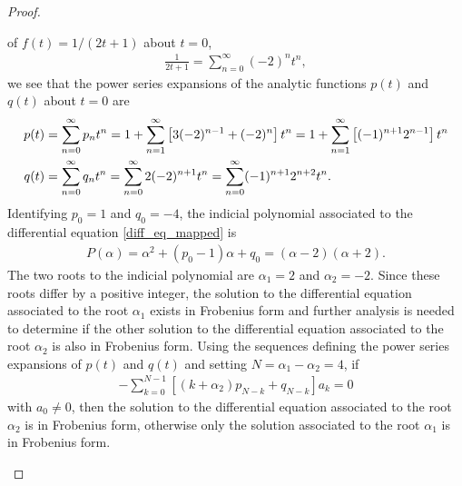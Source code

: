 \documentclass[12pt]{article}
\theoremstyle{definition}
\begin{document}
\begin{proof}
\begin{enumerate}
      of $f(t) = 1/(2t+1)$ about $t=0$,
      \begin{align*}
        \frac{1}{2t+1} = \sum_{n=0}^\infty (-2)^n t^n,
      \end{align*}
      we see that the power series expansions of the analytic functions $p(t)$
      and $q(t)$ about $t=0$ are
      \begin{align}\label{pq_expansion}
        p(t) &= \sum_{n=0}^{\infty}p_n t^n = 1 + \sum_{n=1}^\infty \left[3(-2)^{n-1} + (-2)^{n}\right]t^n  = 1 + \sum_{n=1}^\infty \left[(-1)^{n+1}2^{n-1}\right]t^n \notag \\
        q(t) &= \sum_{n=0}^{\infty}q_n t^n = \sum_{n=0}^\infty2(-2)^{n+1}t^n = \sum_{n=0}^\infty(-1)^{n+1}2^{n+2}t^n.
      \end{align}
      Identifying $p_0 = 1$ and $q_0 = -4$, the indicial polynomial associated to the differential equation \eqref{diff_eq_mapped} is
      \begin{align*}
        P(\alpha) = \alpha^2 + (p_0 - 1)\alpha + q_0 = (\alpha-2)(\alpha+2).
      \end{align*}
      The two roots to the indicial polynomial are $\alpha_1 = 2$ and $\alpha_2 = -2$. Since these roots
      differ by a positive integer, the solution to the differential equation associated to the root $\alpha_1$ exists in Frobenius
      form and further analysis is needed to determine if the other solution to the differential equation associated to the root $\alpha_2$
      is also in Frobenius form. Using the sequences defining the power series expansions of $p(t)$ and $q(t)$ and setting $N = \alpha_1 - \alpha_2 = 4$, if
      \begin{align*}
        -\sum_{k=0}^{N-1} \left[(k + \alpha_2)p_{N-k} + q_{N-k}\right]a_k = 0
      \end{align*}
      with $a_0 \neq 0$, then the solution to the differential equation associated to the root $\alpha_2$ is
      in Frobenius form, otherwise only the solution associated to the root $\alpha_1$ is
      in Frobenius form.


\end{enumerate}
\end{proof}
\end{document}
